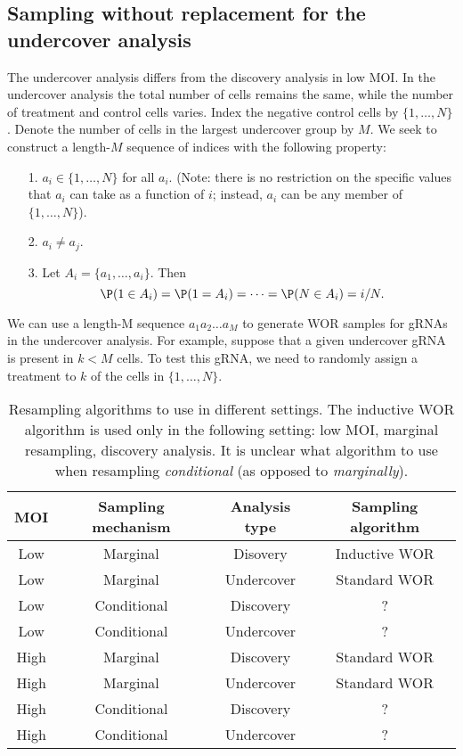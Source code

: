 \documentclass[12pt]{article}
\begin{document}
\subsection*{Sampling without replacement for the undercover analysis}

The undercover analysis differs from the discovery analysis in low MOI. In the undercover analysis the total number of cells remains the same, while the number of treatment and control cells varies. Index the negative control cells by $\{1, \dots, N\}$. Denote the number of cells in the largest undercover group by $M$. We seek to construct a length-$M$ sequence of indices with the following property:

\begin{itemize}
\item[1.] $a_i \in \{1, \dots, N\}$ for all $a_i$. (Note: there is no restriction on the specific values that $a_i$ can take as a function of $i$; instead, $a_i$ can be any member of $ \{1, \dots, N \}$).
\item[2.] $a_i \neq a_j$.
\item[3.] Let $A_i = \{ a_1, \dots, a_i \}.$ Then
$$ \P( 1 \in A_i ) = \P(1 = A_i) = \dots = \P(N \in A_i ) = i/N.$$
\end{itemize}

We can use a length-M sequence $a_1 a_2 \dots a_M$ to generate WOR samples for gRNAs in the undercover analysis. For example, suppose that a given undercover gRNA is present in $k < M$ cells. To test this gRNA, we need to randomly assign a treatment to $k$ of the cells in $\{ 1, \dots, N \}$. 

\begin{table}
\begin{tabular}{cccc}
	\hline 
	\textbf{MOI} & \textbf{Sampling mechanism} & \textbf{Analysis type} & \textbf{Sampling algorithm} \\ 
	\hline 
	Low & Marginal & Disovery &  Inductive WOR \\
	\hline 
	Low & Marginal & Undercover & Standard WOR \\ 
	\hline 
	Low & Conditional & Discovery &  ? \\ 
	\hline 
	Low & Conditional & Undercover & ? \\ 
	\hline 
	High & Marginal & Discovery & Standard WOR \\ 
	\hline 
	High & Marginal & Undercover & Standard WOR  \\ 
	\hline 
	High & Conditional & Discovery & ? \\ 
	\hline 
	High & Conditional & Undercover & ? \\ 
	\hline 
\end{tabular}
	\caption{Resampling algorithms to use in different settings. The inductive WOR algorithm is used only in the following setting: low MOI, marginal resampling, discovery analysis. It is unclear what algorithm to use when resampling \textit{conditional} (as opposed to \textit{marginally}).}
\end{table}



\end{document}

